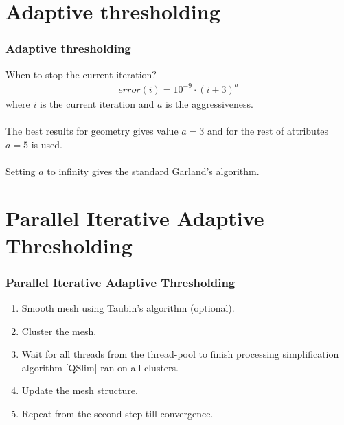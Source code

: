 \documentclass[
	10pt,
	t		%
]{beamer}
\begin{document}
\section{Adaptive thresholding}
\begin{frame}
\frametitle{Adaptive thresholding}
When to stop the current iteration?
\centering
\begin{align}
error(i)=10^{-9}\cdot(i+3)^a
\label{error_formula}
\end{align}
where $i$ is the current iteration and $a$ is the aggressiveness.\\~\\
The best results for geometry gives value $a=3$ and for the rest of attributes $a=5$ is used.\\~\\
Setting $a$ to infinity gives the standard Garland's algorithm.
\end{frame}

\section{Parallel Iterative Adaptive Thresholding}
\begin{frame}
\frametitle{Parallel Iterative Adaptive Thresholding}
\centering
\begin{enumerate}
\item Smooth mesh using Taubin's algorithm (optional).
\item Cluster the mesh.
\item Wait for all threads from the thread-pool to finish processing simplification algorithm [QSlim] ran on all clusters.
\item Update the mesh structure.
\item Repeat from the second step till convergence.
\end{enumerate}
\end{frame}
\end{document}
